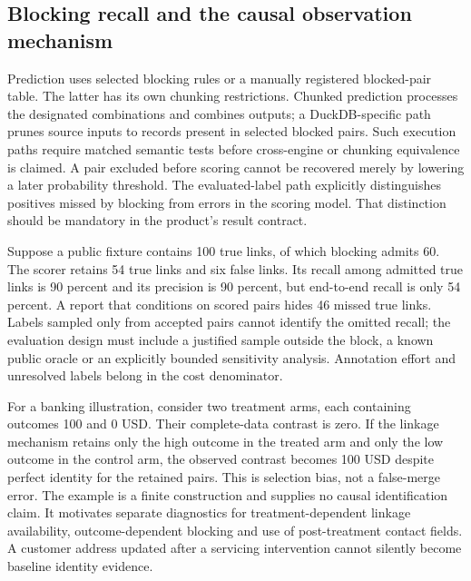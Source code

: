 \subsection{Blocking recall and the causal observation mechanism}
Prediction uses selected blocking rules or a manually registered blocked-pair table. The latter has its own chunking restrictions. Chunked prediction processes the designated combinations and combines outputs; a DuckDB-specific path prunes source inputs to records present in selected blocked pairs. Such execution paths require matched semantic tests before cross-engine or chunking equivalence is claimed. A pair excluded before scoring cannot be recovered merely by lowering a later probability threshold. The evaluated-label path explicitly distinguishes positives missed by blocking from errors in the scoring model. That distinction should be mandatory in the product's result contract.~\citep{exec24_splink_sources}

Suppose a public fixture contains 100 true links, of which blocking admits 60. The scorer retains 54 true links and six false links. Its recall among admitted true links is 90 percent and its precision is 90 percent, but end-to-end recall is only 54 percent. A report that conditions on scored pairs hides 46 missed true links. Labels sampled only from accepted pairs cannot identify the omitted recall; the evaluation design must include a justified sample outside the block, a known public oracle or an explicitly bounded sensitivity analysis. Annotation effort and unresolved labels belong in the cost denominator.~\citep{exec24_splink_contract}

For a banking illustration, consider two treatment arms, each containing outcomes 100 and 0 USD. Their complete-data contrast is zero. If the linkage mechanism retains only the high outcome in the treated arm and only the low outcome in the control arm, the observed contrast becomes 100 USD despite perfect identity for the retained pairs. This is selection bias, not a false-merge error. The example is a finite construction and supplies no causal identification claim. It motivates separate diagnostics for treatment-dependent linkage availability, outcome-dependent blocking and use of post-treatment contact fields. A customer address updated after a servicing intervention cannot silently become baseline identity evidence.~\citep{exec24_splink_contract}

